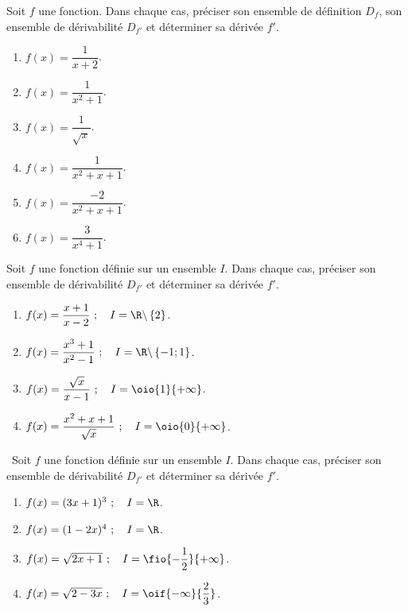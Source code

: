 \documentclass[a4paper,11pt,exos]{nsi} %
\begin{document}
Soit $f$ une fonction. Dans chaque cas, préciser son ensemble de définition $D_f$, son ensemble de dérivabilité $D_{f'}$ et déterminer sa dérivée $f'$.
\begin{multicols}{3}
	\begin{enumerate}
		\item 	$f(x)=\dfrac{1}{x+2}$.
		\item 	$f(x)=\dfrac{1}{x^2+1}$.	
		\item	$f(x)=\dfrac{1}{\sqrt{x}}$.
		\item	$f(x)=\dfrac{1}{x^2+x+1}$.
		\item	$f(x)=\dfrac{-2}{x^2+x+1}$.
		\item	$f(x)=\dfrac{3}{x^4+1}$.
	\end{enumerate}
\end{multicols}


Soit $f$ une fonction définie sur un ensemble $I$. Dans chaque cas, préciser son ensemble de dérivabilité $D_{f'}$ et déterminer sa dérivée $f'$.
\begin{multicols}{2}
	\begin{enumerate}
		\item 	$f(x)=\dfrac{x+1}{x-2}\ ; \quad I=\R \backslash\left\{2\right\}$.
		\item 	$f(x)=\dfrac{x^3+1}{x^2-1}\ ; \quad I=\R \backslash\left\{-1;1\right\}$.
		\item	$f(x)=\dfrac{\sqrt{x}}{x-1}\ ; \quad I=\oio{1}{+\infty}$.
		\item	$f(x)=\dfrac{x^2+x+1}{\sqrt{x}}\ ; \quad I=\oio{0}{+\infty}$.
	\end{enumerate}
\end{multicols}
\vspace{0.5cm}


\
Soit $f$ une fonction définie sur un ensemble $I$. Dans chaque cas, préciser son ensemble de dérivabilité $D_{f'}$ et déterminer sa dérivée $f'$.
\begin{multicols}{2}
	\begin{enumerate}
		\item 	$f(x)=(3x+1)^3\ ; \quad I=\R$.
		\item 	$f(x)=(1-2x)^4\ ; \quad I=\R$.
		\item	$f(x)=\sqrt{2x+1}\ ; \quad I=\fio{-\dfrac{1}{2}}{+\infty}$.
		\item	$f(x)=\sqrt{2-3x}\ ; \quad I=\oif{-\infty}{\dfrac{2}{3}}$.	
	\end{enumerate}
\end{multicols}
\end{document}
